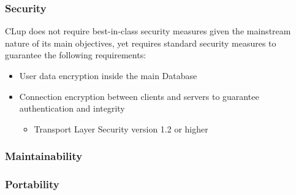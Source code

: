 \subsubsection{Security}
CLup does not require best-in-class security measures given the mainstream nature of its main objectives, yet requires standard security measures to guarantee the following requirements:\newline
\begin{itemize}
    \item User data encryption inside the main Database
    \item Connection encryption between clients and servers to guarantee authentication and integrity 
    \begin{itemize}
        \item Transport Layer Security version 1.2 or higher
    \end{itemize}
\end{itemize}

\subsubsection{Maintainability}

\subsubsection{Portability}
